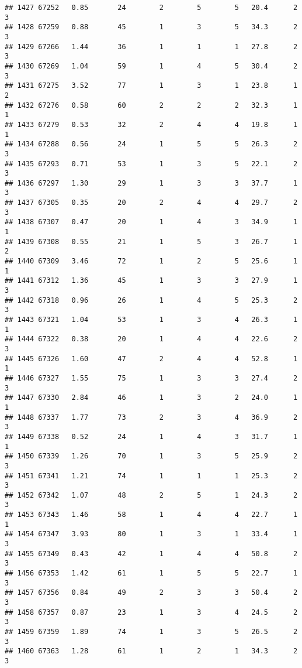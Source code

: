 \documentclass[
]{article}
\begin{document}
\begin{verbatim}
## 1427 67252   0.85       24        2        5        5   20.4      2      3
## 1428 67259   0.88       45        1        3        5   34.3      2      3
## 1429 67266   1.44       36        1        1        1   27.8      2      3
## 1430 67269   1.04       59        1        4        5   30.4      2      3
## 1431 67275   3.52       77        1        3        1   23.8      1      2
## 1432 67276   0.58       60        2        2        2   32.3      1      1
## 1433 67279   0.53       32        2        4        4   19.8      1      1
## 1434 67288   0.56       24        1        5        5   26.3      2      3
## 1435 67293   0.71       53        1        3        5   22.1      2      3
## 1436 67297   1.30       29        1        3        3   37.7      1      3
## 1437 67305   0.35       20        2        4        4   29.7      2      3
## 1438 67307   0.47       20        1        4        3   34.9      1      1
## 1439 67308   0.55       21        1        5        3   26.7      1      2
## 1440 67309   3.46       72        1        2        5   25.6      1      1
## 1441 67312   1.36       45        1        3        3   27.9      1      3
## 1442 67318   0.96       26        1        4        5   25.3      2      3
## 1443 67321   1.04       53        1        3        4   26.3      1      1
## 1444 67322   0.38       20        1        4        4   22.6      2      3
## 1445 67326   1.60       47        2        4        4   52.8      1      1
## 1446 67327   1.55       75        1        3        3   27.4      2      3
## 1447 67330   2.84       46        1        3        2   24.0      1      1
## 1448 67337   1.77       73        2        3        4   36.9      2      3
## 1449 67338   0.52       24        1        4        3   31.7      1      1
## 1450 67339   1.26       70        1        3        5   25.9      2      3
## 1451 67341   1.21       74        1        1        1   25.3      2      3
## 1452 67342   1.07       48        2        5        1   24.3      2      3
## 1453 67343   1.46       58        1        4        4   22.7      1      1
## 1454 67347   3.93       80        1        3        1   33.4      1      3
## 1455 67349   0.43       42        1        4        4   50.8      2      3
## 1456 67353   1.42       61        1        5        5   22.7      1      3
## 1457 67356   0.84       49        2        3        3   50.4      2      3
## 1458 67357   0.87       23        1        3        4   24.5      2      3
## 1459 67359   1.89       74        1        3        5   26.5      2      3
## 1460 67363   1.28       61        1        2        1   34.3      2      3

\end{verbatim}
\end{document}
